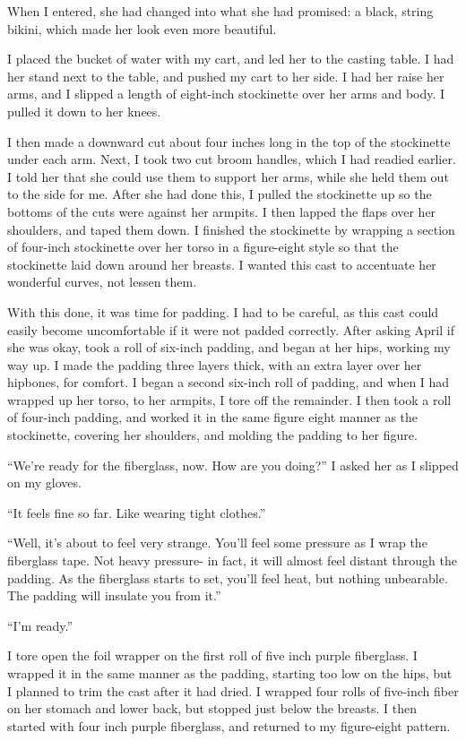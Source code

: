 When I entered, she had changed into what she had promised: a black, string bikini, which made
her look even more beautiful.

I placed the bucket of water with my cart, and led her to the casting table. I had her stand
next to the table, and pushed my cart to her side. I had her raise her arms, and I slipped a
length of eight-inch stockinette over her arms and body. I pulled it down to her knees.

I then made a downward cut about four inches long in the top of the stockinette under each arm.
Next, I took two cut broom handles, which I had readied earlier. I told her that she could use
them to support her arms, while she held them out to the side for me. After she had done this, I
pulled the stockinette up so the bottoms of the cuts were against her armpits. I then lapped the
flaps over her shoulders, and taped them down. I finished the stockinette by wrapping a section
of four-inch stockinette over her torso in a figure-eight style so that the stockinette laid
down around her breasts. I wanted this cast to accentuate her wonderful curves, not lessen them.

With this done, it was time for padding. I had to be careful, as this cast could easily become
uncomfortable if it were not padded correctly. After asking April if she was okay, took a roll
of six-inch padding, and began at her hips, working my way up. I made the padding three layers
thick, with an extra layer over her hipbones, for comfort. I began a second six-inch roll of
padding, and when I had wrapped up her torso, to her armpits, I tore off the remainder. I then
took a roll of four-inch padding, and worked it in the same figure eight manner as the
stockinette, covering her shoulders, and molding the padding to her figure.

``We're ready for the fiberglass, now. How are you doing?'' I asked her as I slipped on my
gloves.

``It feels fine so far. Like wearing tight clothes.''

``Well, it's about to feel very strange. You'll feel some pressure as I wrap the fiberglass
tape. Not heavy pressure- in fact, it will almost feel distant through the padding. As the
fiberglass starts to set, you'll feel heat, but nothing unbearable. The padding will insulate
you from it.''

``I'm ready.''

I tore open the foil wrapper on the first roll of five inch purple fiberglass. I wrapped it in
the same manner as the padding, starting too low on the hips, but I planned to trim the cast
after it had dried. I wrapped four rolls of five-inch fiber on her stomach and lower back, but
stopped just below the breasts. I then started with four inch purple fiberglass, and returned to
my figure-eight pattern.

